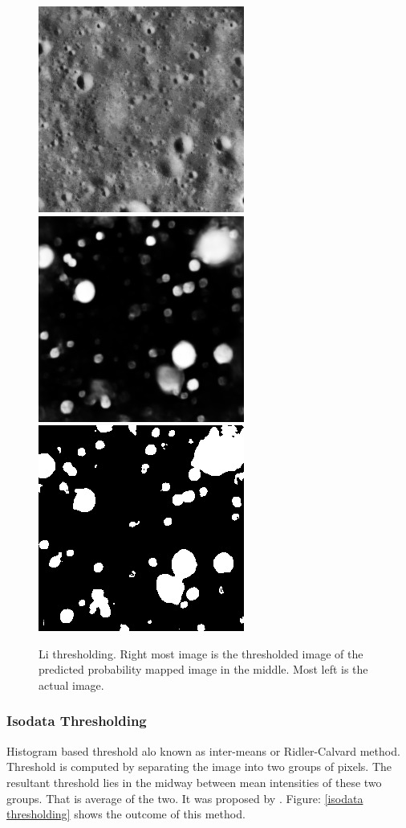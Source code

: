 \documentclass[11pt]{article}
\begin{document}
\begin{figure}[H]
	\includegraphics[width=.3\textwidth]{files/results/26.png}\hfill	
	\includegraphics[width=.3\textwidth]{files/results/26_predict.png}\hfill
	\includegraphics[width=.3\textwidth]{files/results/li.png}\hfill
	\caption{Li thresholding. Right most image is the thresholded image of the predicted probability mapped image in the middle. Most left is the actual image.}
	\label{Li thresholding}
\end{figure}

\subsubsection{Isodata Thresholding}
Histogram based threshold alo known as inter-means or Ridler-Calvard method. Threshold is computed by separating the image into two groups of pixels. The resultant threshold lies in the midway between mean intensities of these two groups. That is average of the two. It was proposed by \cite{ridler1978picture}. Figure: \ref{isodata thresholding} shows the outcome of this method.
\end{document}
